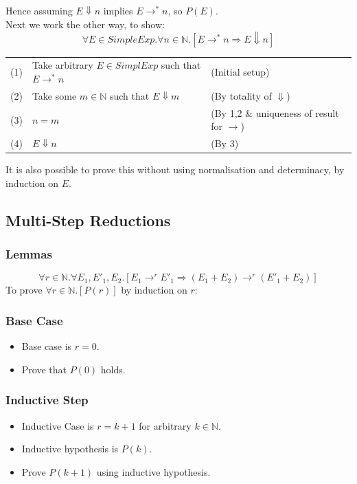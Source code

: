 Hence assuming $E \Downarrow n$ implies $E \to^* n$, so $P(E)$.
\\
Next we work the other way, to show:
\[\forall E \in SimpleExp . \forall n \in \mathbb{N}.[E \to^* n \Rightarrow E \Downarrow n ]\]
\begin{center}
	\begin{tabular}{l l l}
		(1) & Take arbitrary $E \in SimplExp$ such that $E \to^* n$   & (Initial setup)                            \\
		(2) & Take some $m \in \mathbb{N}$ such that $E \Downarrow m$ & (By totality of $\Downarrow$)              \\
		(3) & $n = m$                                                 & (By 1,2 \& uniqueness of result for $\to$) \\
		(4) & $E \Downarrow n$                                        & (By 3)                                     \\
	\end{tabular}
\end{center}
It is also possible to prove this without using normalisation and determinacy, by induction on $E$.
\subsection{Multi-Step Reductions}
\subsubsection*{Lemmas}
\[\forall r \in \mathbb{N}. \forall E_1, E'_1, E_2 . [E_1 \to^r E'_1 \Rightarrow (E_1 + E_2) \to^r (E'_1 + E_2)]\]
To prove $\forall r \in \mathbb{N} . [P(r)]$ by induction on $r$:
\subsubsection*{Base Case}
\begin{itemize}
	\item Base case is $r = 0$.
	\item Prove that $P(0)$ holds.
\end{itemize}
\subsubsection*{Inductive  Step}
\begin{itemize}
	\item Inductive Case is $r = k + 1$ for arbitrary $k \in \mathbb{N}$.
	\item Inductive hypothesis is $P(k)$.
	\item Prove $P(k + 1)$ using inductive hypothesis.
\end{itemize}
